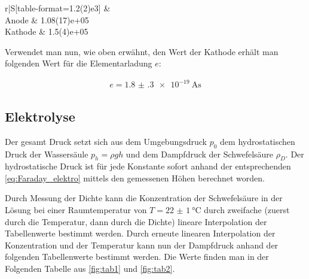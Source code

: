 \documentclass[11pt,ngerman]{scrartcl}
\begin{document}
\begin{table}[H]
	\caption{erhaltene Werte für die Faraday-Konstanten mit dem zusätzlichen Massendefekt mit den Werten der Anode und Kathode
		\\$F \dots$ erhaltene Faraday- Konstante}
	\label{tab:elekfarad}
	\begin{center}
		\begin{tabular}[c]{r|S[table-format=1.2(2)e3]}
			\hline
			 &
			        \\
			\hline
			Anode                                   & 1.08(17)e+05 \\
			Kathode                                 & 1.5(4)e+05   \\
			\hline
		\end{tabular}
	\end{center}
\end{table}


Verwendet man nun, wie oben erwähnt, den Wert der Kathode
erhält man folgenden Wert für die Elementarladung $e$:

\begin{align*}
	e = \SI{1.8(3)e-19}{\ampere\second}
	\label{silber_elem}
\end{align*}


\subsection{Elektrolyse}

Der gesamt Druck setzt sich aus dem Umgebungsdruck $p_0$ dem hydrostatischen
Druck der Wassersäule $p_h = \rho g h$ und dem Dampfdruck der Schwefelsäure $\rho_D$.
Der hydrostatische Druck ist für jede Konstante sofort anhand der entsprechenden \autoref{eq:Faraday_elektro} mittels den gemessenen Höhen berechnet worden.

\vspace{2mm}

Durch Messung der Dichte kann die Konzentration der Schwefelsäure in der Lösung bei einer Raumtemperatur von $T = \SI{22(1)}{\celsius}$ durch zweifache (zuerst durch die Temperatur, dann durch die Dichte) lineare Interpolation der Tabellenwerte bestimmt werden. Durch erneute linearen Interpolation der Konzentration und
der Temperatur
kann nun der Dampfdruck anhand der folgenden Tabellenwerte bestimmt werden.
Die Werte finden man in der Folgenden Tabelle aus \autoref{fig:tab1} und \autoref{fig:tab2}. \cite{vorlagesilber}
\end{document}
